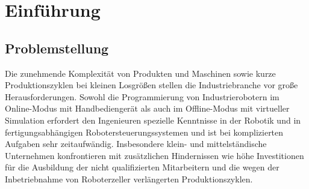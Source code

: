 \documentclass[14pt,a4paper,titlepage]{article}
\begin{document}
	\begin{abstract}
		
		Ich möchte mich beim Prof. Stefan Bischoff bedanken, dass er mein Betreuer an der Hochschule ist, und mich bei dem Praktikum unterstützt. 
		\bigbreak
		Ich möchte auch Dr. Dai Fan, meinem Betreuer bei ABB Forschungszentrum danken. In meinem Praktikum hat er mir bei theoretischer Fachkenntnisse und auch bei praktischer Anwendungsbereich viele Unterstützung gegeben. Er hat mir alles klar erklärt mit viel Geduld und Verständnis. 
	\end{abstract}
	\renewcommand{\abstractname}{Selbständigkeitserklärung}
	\begin{abstract}
		
		Ich versichere hiermit, dass ich meine Praxisarbeit mit dem Thema „Untersuchung und Implementierung von Methoden der CAD-gestützten Roboterprogrammierung“ selbstständig verfasst und keine anderen als die angegebenen Quellen und Hilfsmittel benutzt habe. Ich versichere zudem, dass die eingereichte elektronische Fassung mit der gedruckten Fassung übereinstimmt.
		\bigbreak
		Die Arbeit wurde bisher keiner anderen Prüfungsbehörde vorgelegt und auch noch nicht veröffentlicht.
		\vfill
		\begin{minipage}{2.0in}
			{\large \underline{Mannheim, \today}
			\\ Ort, Datum}
		\end{minipage}
		\hfill
		\begin{minipage}{2.0in}
			{\large \underline{\hspace{3cm}Dongliang Cao}
				\\ Unterschrift}
		\end{minipage}
	\end{abstract}
	\tableofcontents
	\pagebreak
	\section{Einführung}
	\subsection{Problemstellung}
		Die zunehmende Komplexität von Produkten und Maschinen sowie kurze Produktionszyklen bei kleinen Losgrößen stellen die Industriebranche vor große Herausforderungen. Sowohl die Programmierung von Industrierobotern im Online-Modus mit Handbediengerät als auch im Offline-Modus mit virtueller Simulation erfordert den Ingenieuren spezielle Kenntnisse in der Robotik und in fertigungsabhängigen Robotersteuerungssystemen und ist bei komplizierten Aufgaben sehr zeitaufwändig. Insbesondere klein- und mittelständische Unternehmen konfrontieren mit zusätzlichen Hindernissen wie höhe Investitionen für die Ausbildung der nicht qualifizierten Mitarbeitern und die wegen der Inbetriebnahme von Roboterzeller verlängerten Produktionszyklen.   
\end{document}
